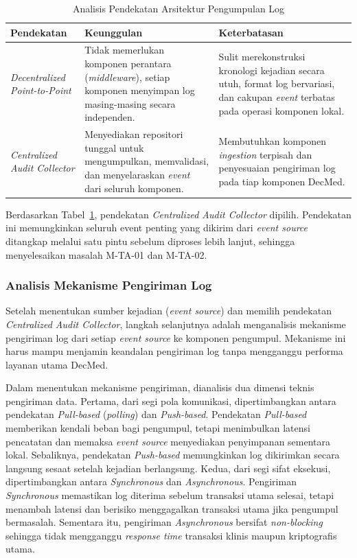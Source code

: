 \begin{table}[htbp]
\centering
\caption{Analisis Pendekatan Arsitektur Pengumpulan Log}
\label{tab:analisis-agregasi}
\renewcommand{\arraystretch}{1.3}
\begin{tabular}{|p{3cm}|p{4.5cm}|p{5.5cm}|}
\hline
\textbf{Pendekatan} & \textbf{Keunggulan} & \textbf{Keterbatasan} \\ \hline
\textit{Decentralized Point-to-Point} & Tidak memerlukan komponen perantara (\textit{middleware}), setiap komponen menyimpan log masing-masing secara independen. & Sulit merekonstruksi kronologi kejadian secara utuh, format log bervariasi, dan cakupan \textit{event} terbatas pada operasi komponen lokal. \\ \hline
\textit{Centralized Audit Collector} & Menyediakan repositori tunggal untuk mengumpulkan, memvalidasi, dan menyelaraskan \textit{event} dari seluruh komponen. & Membutuhkan komponen \textit{ingestion} terpisah dan penyesuaian pengiriman log pada tiap komponen DecMed. \\ \hline
\end{tabular}
\end{table}

Berdasarkan Tabel~\ref{tab:analisis-agregasi}, pendekatan \textit{Centralized Audit Collector} dipilih. Pendekatan ini memungkinkan seluruh event penting yang dikirim dari \textit{event source} ditangkap melalui satu pintu sebelum diproses lebih lanjut, sehingga menyelesaikan masalah M-TA-01 dan M-TA-02.

\subsubsection{Analisis Mekanisme Pengiriman Log}
\label{subsubsec:analisis-mekanisme-pengiriman-log}

Setelah menentukan sumber kejadian (\textit{event source}) dan memilih pendekatan \textit{Centralized Audit Collector}, langkah selanjutnya adalah menganalisis mekanisme pengiriman log dari setiap \textit{event source} ke komponen pengumpul. Mekanisme ini harus mampu menjamin keandalan pengiriman log tanpa mengganggu performa layanan utama DecMed.

Dalam menentukan mekanisme pengiriman, dianalisis dua dimensi teknis pengiriman data. Pertama, dari segi pola komunikasi, dipertimbangkan antara pendekatan \textit{Pull-based} (\textit{polling}) dan \textit{Push-based}. Pendekatan \textit{Pull-based} memberikan kendali beban bagi pengumpul, tetapi menimbulkan latensi pencatatan dan memaksa \textit{event source} menyediakan penyimpanan sementara lokal. Sebaliknya, pendekatan \textit{Push-based} memungkinkan log dikirimkan secara langsung sesaat setelah kejadian berlangsung. Kedua, dari segi sifat eksekusi, dipertimbangkan antara \textit{Synchronous} dan \textit{Asynchronous}. Pengiriman \textit{Synchronous} memastikan log diterima sebelum transaksi utama selesai, tetapi menambah latensi dan berisiko menggagalkan transaksi utama jika pengumpul bermasalah. Sementara itu, pengiriman \textit{Asynchronous} bersifat \textit{non-blocking} sehingga tidak mengganggu \textit{response time} transaksi klinis maupun kriptografis utama.

